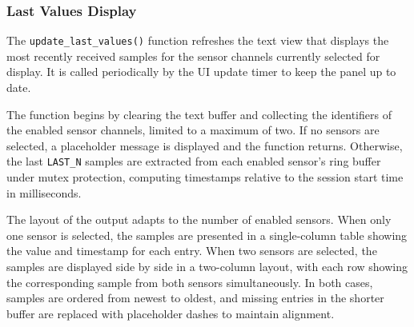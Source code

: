 \subsubsection{Last Values Display}

The \texttt{update\_last\_values()} function refreshes the text view
that displays the most recently received samples for the sensor channels
currently selected for display. It is called periodically by the UI
update timer to keep the panel up to date.

The function begins by clearing the text buffer and collecting the
identifiers of the enabled sensor channels, limited to a maximum of two.
If no sensors are selected, a placeholder message is displayed and the
function returns. Otherwise, the last \texttt{LAST\_N} samples are
extracted from each enabled sensor's ring buffer under mutex protection,
computing timestamps relative to the session start time in milliseconds.

The layout of the output adapts to the number of enabled sensors. When
only one sensor is selected, the samples are presented in a single-column
table showing the value and timestamp for each entry. When two sensors
are selected, the samples are displayed side by side in a two-column
layout, with each row showing the corresponding sample from both sensors
simultaneously. In both cases, samples are ordered from newest to oldest,
and missing entries in the shorter buffer are replaced with placeholder
dashes to maintain alignment.


